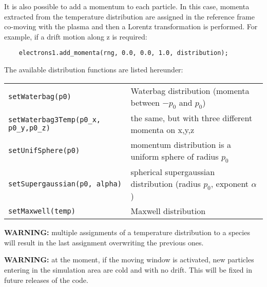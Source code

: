 \documentclass[11pt,a4paper]{report}
\begin{document}
It is also possible to add a momentum to each particle. In this case, momenta extracted from the temperature distribution are assigned in the reference frame co-moving with the plasma and then a Lorentz transformation is performed.   For example, if a drift motion along z is required:
\begin{lstlisting}
	electrons1.add_momenta(rng, 0.0, 0.0, 1.0, distribution);
\end{lstlisting}
The available distribution functions are listed hereunder:
\begin{center}
    \begin{tabular}{ l | l }
    	\verb+setWaterbag(p0)+                    & Waterbag distribution (momenta between $-p_0$ and $p_0$)                \\
    	\verb+setWaterbag3Temp(p0_x, p0_y,p0_z)+  & the same, but with three different momenta on x,y,z                     \\
    	\verb+setUnifSphere(p0)+                  & momentum distribution is a uniform sphere of radius $p_0$               \\
    	\verb+setSupergaussian(p0, alpha)+        & spherical supergaussian distribution (radius $p_0$, exponent $\alpha$)  \\
    	\verb+setMaxwell(temp)+                   & Maxwell distribution                                                    \\
    \end{tabular}
\end{center}
\textbf{WARNING: } multiple assignments of a temperature distribution to a species will result in the last assignment overwriting the previous ones.

\textbf{WARNING: } at the moment, if the moving window is activated, new particles entering in the simulation area are cold and with no drift. This will be fixed in future releases of the code.
\end{document}
